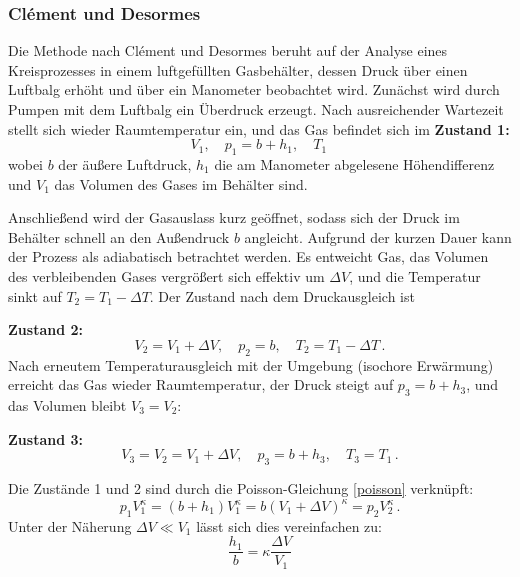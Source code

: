 \subsubsection{Clément und Desormes}

Die Methode nach Clément und Desormes beruht auf der Analyse eines Kreisprozesses in einem luftgefüllten Gasbehälter, dessen Druck über einen Luftbalg erhöht und über ein Manometer beobachtet wird. Zunächst wird durch Pumpen mit dem Luftbalg ein Überdruck erzeugt. Nach ausreichender Wartezeit stellt sich wieder Raumtemperatur ein, und das Gas befindet sich im 
\textbf{Zustand 1:}
\begin{equation}\label{CD_state1}
    V_1,\quad p_1 = b + h_1,\quad T_1 \, 
\end{equation}
wobei \(b\) der äußere Luftdruck, \(h_1\) die am Manometer abgelesene Höhendifferenz und \(V_1\) das Volumen des Gases im Behälter sind.

Anschließend wird der Gasauslass kurz geöffnet, sodass sich der Druck im Behälter schnell an den Außendruck \(b\) angleicht. Aufgrund der kurzen Dauer kann der Prozess als adiabatisch betrachtet werden. Es entweicht Gas, das Volumen des verbleibenden Gases vergrößert sich effektiv um \(\Delta V\), und die Temperatur sinkt auf \(T_2 = T_1 - \Delta T\). Der Zustand nach dem Druckausgleich ist

\textbf{Zustand 2:}
\begin{equation}\label{CD_state2}
    V_2 = V_1 + \Delta V,\quad p_2 = b,\quad T_2 = T_1 - \Delta T \, .
\end{equation}
Nach erneutem Temperaturausgleich mit der Umgebung (isochore Erwärmung) erreicht das Gas wieder Raumtemperatur, der Druck steigt auf \(p_3 = b + h_3\), und das Volumen bleibt \(V_3 = V_2\):

\textbf{Zustand 3:}
\begin{equation}\label{CD_state3}
    V_3 = V_2 = V_1 + \Delta V,\quad p_3 = b + h_3,\quad T_3 = T_1 \, .
\end{equation}


Die Zustände 1 und 2 sind durch die Poisson-Gleichung \cref{poisson} verknüpft:
\begin{equation}\label{CD_poisson}
    p_1 V_1^{\kappa} = (b+h_1)V_1^\kappa = b (V_1+\Delta V)^\kappa = p_2 V_2^{\kappa} \, .
\end{equation}
Unter der Näherung \(\Delta V \ll V_1\) lässt sich dies vereinfachen zu: 
\begin{equation}
    \frac{h_1}{b}=\kappa\frac{\Delta V}{V_1}
    \label{poissonumgeformt}
\end{equation} 

